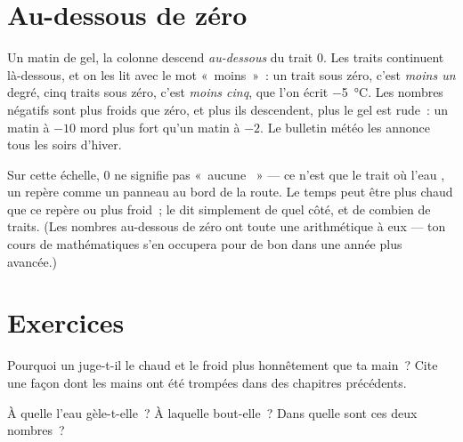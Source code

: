 \section{Au-dessous de zéro}

\begin{example}\label{ex:g3:temperature-thermometers:belowzero}
Un matin de gel, la colonne descend \emph{au-dessous} du trait $0$.
Les traits continuent là-dessous, et on les lit avec le mot
«~moins~»~: un trait sous zéro, c'est \emph{moins un} degré, cinq
traits sous zéro, c'est \emph{moins cinq}, que l'on écrit
\qty{-5}{\celsius}. Les nombres négatifs sont plus froids que zéro,
et plus ils descendent, plus le gel est rude~: un matin à $-10$ mord
plus fort qu'un matin à $-2$. Le bulletin météo les annonce tous les
soirs d'hiver.
\end{example}

\begin{remark}\label{rem:g3:temperature-thermometers:zero}
Sur cette échelle, $0$ ne signifie pas «~aucune ~» --- ce
n'est que le trait où l'eau , un repère comme un panneau au bord
de la route. Le temps peut être plus chaud que ce repère ou plus
froid~; le  dit simplement de quel côté, et de combien de
traits. (Les nombres au-dessous de zéro ont toute une arithmétique à
eux --- ton cours de mathématiques s'en occupera pour de bon dans une
année plus avancée.)
\end{remark}

\section{Exercices}

\begin{exercise}[$\star$]\label{exo:g3:temperature-thermometers:1}
Pourquoi un  juge-t-il le chaud et le froid plus
honnêtement que ta main~? Cite une façon dont les mains ont été
trompées dans des chapitres précédents.
\end{exercise}

\begin{exercise}[$\star$]\label{exo:g3:temperature-thermometers:2}
À quelle  l'eau gèle-t-elle~? À laquelle bout-elle~? Dans
quelle  sont ces deux nombres~?
\end{exercise}

